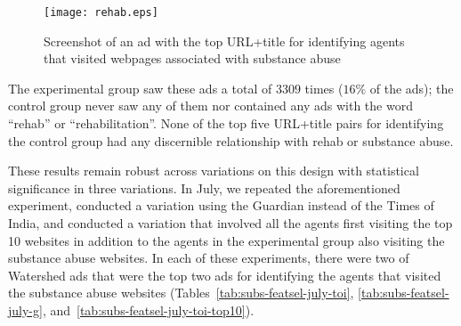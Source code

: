 \documentclass{article}
\newcommand{\onlyarxiv}[1]{{#1}}
\begin{document}
\begin{figure}
\onlyarxiv{\vspace{2ex}}
\centerline{\texttt{[image: rehab.eps]}}
\onlyarxiv{\vspace{-3ex}}
\caption{Screenshot of an ad with the top URL+title for identifying agents that visited webpages associated with substance abuse}
\label{fig:rehab}
\end{figure}
The experimental group saw these ads a total of $3309$ times ($16\%$ of the ads); the control group never saw any of them nor contained any ads with the word ``rehab'' or ``rehabilitation''.
None of the top five URL+title pairs for identifying the control group had any discernible relationship with rehab or substance abuse.


These results remain robust across variations on this design with statistical significance in three variations.
In July, we repeated the aforementioned experiment, conducted a variation using the Guardian instead of the Times of India, and conducted a variation that involved all the agents first visiting the top 10 websites in addition to the agents in the experimental group also visiting the substance abuse websites.  In each of these experiments, there were two of Watershed ads that were the top two ads for identifying the agents that visited the substance abuse websites (Tables~\ref{tab:subs-featsel-july-toi}, \ref{tab:subs-featsel-july-g}, and~\ref{tab:subs-featsel-july-toi-top10}).
\end{document}
